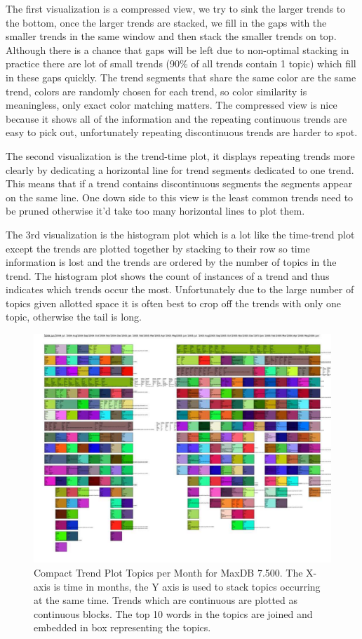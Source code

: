 \documentclass[times, 10pt,twocolumn]{article}
\begin{document}
The first visualization is a compressed view, we try to sink the
larger trends to the bottom, once the larger trends are stacked, we
fill in the gaps with the smaller trends in the same window and then
stack the smaller trends on top. Although there is a chance that gaps
will be left due to non-optimal stacking in practice there are lot of
small trends (90\% of all trends contain 1 topic) which fill in these
gaps quickly. The trend segments that share the same color are the
same trend, colors are randomly chosen for each trend, so color
similarity is meaningless, only exact color matching matters.
The compressed view is nice because it shows all of the
information and the repeating continuous trends are easy to pick out,
unfortunately repeating discontinuous trends are harder to spot.

The second visualization is the trend-time plot, it displays repeating
trends more clearly by dedicating a horizontal line for trend segments
dedicated to one trend. This means that if a trend contains
discontinuous segments the segments appear on the same line. One down
side to this view is the least common trends need to be pruned
otherwise it'd take too many horizontal lines to plot them.

The 3rd visualization is the histogram plot which is a lot like the
time-trend plot except the trends are plotted together by stacking to
their row so time information is lost and the trends are ordered by
the number of topics in the trend. The histogram plot shows the count
of instances of a trend and thus indicates which trends occur the
most. Unfortunately due to the large number of topics given allotted
space it is often best to crop off the trends with only one topic,
otherwise the tail is long.

\begin{figure}
  \centering
  \includegraphics[width=1.0\textwidth]{fixed-time-smear-plot-scaled}
  \caption{Compact Trend Plot Topics per Month for MaxDB 7.500. The
    X-axis is time in months, the Y axis is used to stack topics
    occurring at the same time. Trends which are continuous are
    plotted as continuous blocks. The top 10 words in the topics are
    joined and embedded in box representing the topics.}
  \label{fig:topicsmear}
\end{figure}
\end{document}
